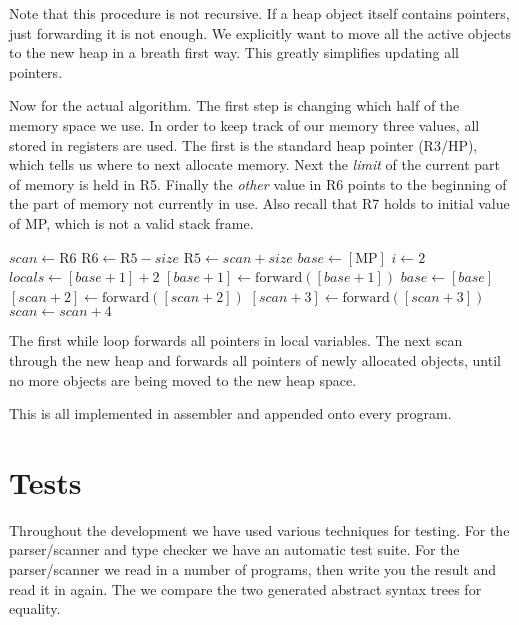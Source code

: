 \documentclass{scrartcl}
\begin{document}
Note that this procedure is not recursive. If a heap object itself
contains pointers, just forwarding it is not enough. We explicitly
want to move all the active objects to the new heap in a breath first
way. This greatly simplifies updating all pointers.

Now for the actual algorithm. The first step is changing which half
of the memory space we use. In order to keep track of our memory three
values, all stored in registers are used. The first is the standard
heap pointer (R3/HP), which tells us where to next allocate memory.
Next the \emph{limit} of the current part of memory is held in R5.
Finally the \emph{other} value in R6 points to the beginning of the
part of memory not currently in use. Also recall that R7 holds to initial
value of MP, which is not a valid stack frame.

\begin{algorithmic}
\State $scan \gets \mathrm{R6}$ 
\State $\mathrm{R6} \gets \mathrm{R5} - size$ 
\State $\mathrm{R5} \gets scan + size$
\State {}
\State $base \gets [\mathrm{MP}]$
 
    \State $i \gets 2$
    \State $locals \gets [base + 1] + 2$
        \State $[base + 1] \gets \mathrm{forward}([base + 1])$
    \EndWhile
    \State $base \gets [base]$
\EndWhile
{} 
    \State $[scan + 2] \gets \mathrm{forward}([scan + 2])$
    \State $[scan + 3] \gets \mathrm{forward}([scan + 3])$
    \State $scan \gets scan + 4$
\EndWhile
\end{algorithmic}
The first while loop forwards all pointers in local variables.
The next scan through the new heap and forwards all pointers
of newly allocated objects, until no more objects are being moved
to the new heap space.

This is all implemented in assembler and appended onto every program.

\section{Tests}

Throughout the development we have used various techniques for testing.
For the parser/scanner and type checker we have an automatic test
suite. For the parser/scanner we read in a number of programs, then
write you the result and read it in again. The we compare the two 
generated abstract syntax trees for equality.
\end{document}

